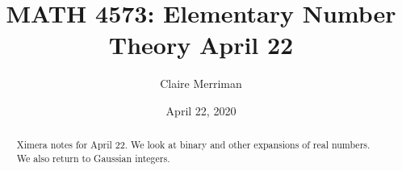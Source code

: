 \documentclass{xourse}
\title{MATH 4573: Elementary Number Theory April 22}
\author{Claire Merriman}
\date{April 22, 2020}
\begin{document}
  
\begin{abstract} %
Ximera notes for April 22.  We look at binary and other expansions of real numbers. We also return to Gaussian integers.
\end{abstract}  
\maketitle 
 
\end{document}
